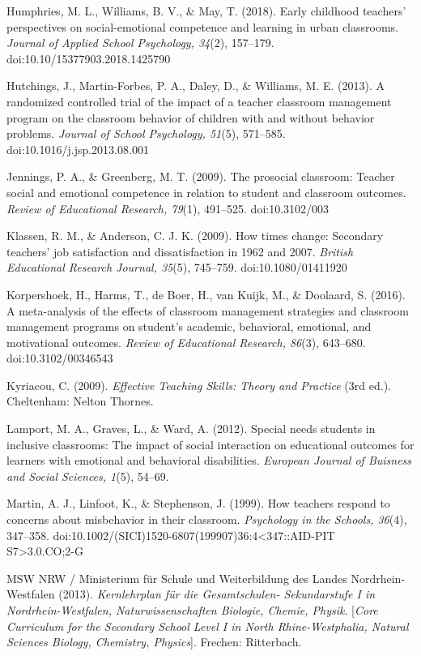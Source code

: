 \documentclass[11.5pt]{sig-alternate} %
\begin{document}
Humphries, M. L., Williams, B. V., \& May, T. (2018). Early childhood teachers’ perspectives on social-emotional competence and learning in urban classrooms. \textit{Journal of Applied School Psychology, 34}(2), 157–179. doi:10.10/15377903.2018.1425790

Hutchings, J., Martin-Forbes, P. A., Daley, D., \& Williams, M. E. (2013). A randomized controlled trial of the impact of a teacher classroom management program on the classroom behavior of children with and without behavior problems. \textit{Journal of School Psychology, 51}(5), 571–585. doi:10.1016/j.jsp.2013.08.001

Jennings, P. A., \& Greenberg, M. T. (2009). The prosocial classroom: Teacher social and emotional competence in relation to student and classroom outcomes. \textit{Review of Educational Research, 79}(1), 491–525. doi:10.3102/003

Klassen, R. M., \& Anderson, C. J. K. (2009). How times change: Secondary teachers’ job satisfaction and dissatisfaction in 1962 and 2007. \textit{British Educational Research Journal, 35}(5), 745–759. doi:10.1080/01411920

Korpershoek, H., Harms, T., de Boer, H., van Kuijk, M., \& Doolaard, S. (2016). A meta-analysis of the effects of classroom management strategies and classroom management programs on student’s academic, behavioral, emotional, and motivational outcomes. \textit{Review of Educational Research, 86}(3), 643–680. doi:10.3102/00346543

Kyriacou, C. (2009). \textit{Effective Teaching Skills: Theory and Practice} (3rd ed.). Cheltenham: Nelton Thornes.

Lamport, M. A., Graves, L., \& Ward, A. (2012). Special needs students in inclusive classrooms: The impact of social interaction on educational outcomes for learners with emotional and behavioral disabilities. \textit{European Journal of Buisness and Social Sciences, 1}(5), 54–69. 

Martin, A. J., Linfoot, K., \& Stephenson, J. (1999). How teachers respond to concerns about misbehavior in their classroom. \textit{Psychology in the Schools, 36}(4), 347–358. doi:10.1002/(SICI)1520-6807(199907)36:4<347::AID-PIT\\S7>3.0.CO;2-G

MSW NRW / Ministerium für Schule und Weiterbildung des Landes Nordrhein-Westfalen (2013). \textit{Kernlehrplan für die Gesamtschulen- Sekundarstufe I in Nordrhein-Westfalen, Naturwissenschaften Biologie, Chemie, Physik}. [\textit{Core Curriculum for the Secondary School Level I in North Rhine-Westphalia, Natural Sciences Biology, Chemistry, Physics}]. Frechen: Ritterbach.
\end{document}
